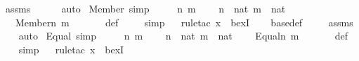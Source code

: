 \begin{isabellebody}
\ assms\isanewline
\ \ \ \ \isamarkupfalse%
\ auto\isanewline
{}\isamarkupfalse%
%
\endisatagproof
{\isafoldproof}%
%
\isadelimproof
\isanewline
%
\endisadelimproof
\isanewline
{}\isamarkupfalse%
\ Member{\isacharunderscore}{\kern0pt}{\isasymDelta}{}\ {\isacharbrackleft}{\kern0pt}simp{\isacharbrackright}{\kern0pt}\ {\isacharcolon}{\kern0pt}\ \isanewline
\ \ \ n\ m\ \isanewline
\ \ \ {\isachardoublequoteopen}n\ {\isasymin}\ nat{\isachardoublequoteclose}\ {\isachardoublequoteopen}m\ {\isasymin}\ nat{\isachardoublequoteclose}\ \isanewline
\ \ \ {\isachardoublequoteopen}Member{\isacharparenleft}{\kern0pt}n{\isacharcomma}{\kern0pt}\ m{\isacharparenright}{\kern0pt}\ {\isasymin}\ {\isasymDelta}{}{\isachardoublequoteclose}\ \isanewline
%
\isadelimproof
\ \ %
\endisadelimproof
%
\isatagproof
{}\isamarkupfalse%
\ {\isasymDelta}{}{\isacharunderscore}{\kern0pt}def\ \isanewline
\ \ \isamarkupfalse%
\ simp\isanewline
\ \ \isamarkupfalse%
{\isacharparenleft}{\kern0pt}rule{\isacharunderscore}{\kern0pt}tac\ x{\isacharequal}{\kern0pt}{}\ \ bexI{\isacharparenright}{\kern0pt}\isanewline
\ \ \isamarkupfalse%
\ {\isasymDelta}{}{\isacharunderscore}{\kern0pt}base{\isacharunderscore}{\kern0pt}def\ \isanewline
\ \ \isamarkupfalse%
\ assms\isanewline
\ \ \isamarkupfalse%
\ auto%
\endisatagproof
{\isafoldproof}%
%
\isadelimproof
\isanewline
%
\endisadelimproof
\isanewline
{}\isamarkupfalse%
\ Equal{\isacharunderscore}{\kern0pt}{\isasymDelta}{}\ {\isacharbrackleft}{\kern0pt}simp{\isacharbrackright}{\kern0pt}\ {\isacharcolon}{\kern0pt}\ \isanewline
\ \ \ n\ m\ \isanewline
\ \ \ {\isachardoublequoteopen}n\ {\isasymin}\ nat{\isachardoublequoteclose}\ {\isachardoublequoteopen}m\ {\isasymin}\ nat{\isachardoublequoteclose}\ \isanewline
\ \ \ {\isachardoublequoteopen}Equal{\isacharparenleft}{\kern0pt}n{\isacharcomma}{\kern0pt}\ m{\isacharparenright}{\kern0pt}\ {\isasymin}\ {\isasymDelta}{}{\isachardoublequoteclose}\ \isanewline
%
\isadelimproof
\ \ %
\endisadelimproof
%
\isatagproof
{}\isamarkupfalse%
\ {\isasymDelta}{}{\isacharunderscore}{\kern0pt}def\ \isanewline
\ \ \isamarkupfalse%
\ simp\isanewline
\ \ \isamarkupfalse%
{\isacharparenleft}{\kern0pt}rule{\isacharunderscore}{\kern0pt}tac\ x{\isacharequal}{\kern0pt}{}\ \ bexI{\isacharparenright}{\kern0pt}\isanewline

\end{isabellebody}
